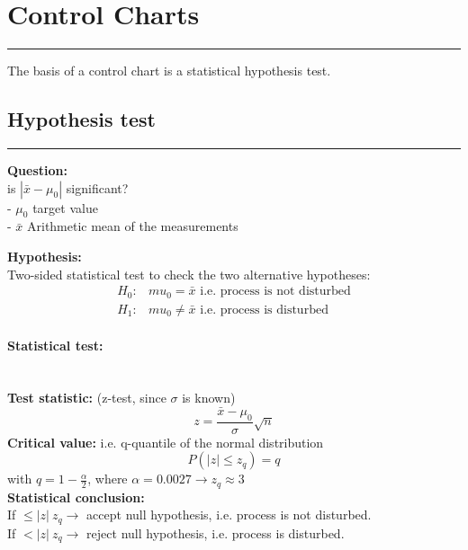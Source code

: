 \section{Control Charts}
\noindent\rule[\linienAbstand]{\linewidth}{\linienDickeDick}
The basis of a control chart is a statistical hypothesis test.

\subsection{Hypothesis test}
\noindent\rule[\linienAbstand]{\linewidth}{\linienDicke}

\textbf{Question:}\\
is $\left|\bar{x} - \mu_0\right|$ significant?\\
 - $\mu_0$ target value\\
 - $\bar{x}$ Arithmetic mean of the measurements


\textbf{Hypothesis:}\\
Two-sided statistical test to check the two alternative hypotheses:
\begin{equation}
  \begin{split}
    H_0:& mu_0 = \bar{x} \text{ i.e. process is not disturbed}\\
    H_1:& mu_0 \neq \bar{x} \text{ i.e. process is disturbed}
  \end{split}
\end{equation}

\paragraph{Statistical test:}\mbox{}\\
\textbf{Test statistic:} (z-test, since $\sigma$ is known)
\begin{equation}
  z = \frac{\bar{x}-\mu_0}{\sigma}\sqrt{n}
\end{equation}
\textbf{Critical value:} i.e. q-quantile of the normal distribution
\begin{equation}
  P(|z| \leq z_q) = q
\end{equation}
with $q = 1- \frac{\alpha}{2}$, where $\alpha = 0.0027 \rightarrow z_q \approx 3$\\

\textbf{Statistical conclusion:}\\
If $\leq |z| \ z_q \rightarrow$ accept null hypothesis, i.e. process is not disturbed.\\
If $< |z| \ z_q \rightarrow$ reject null hypothesis, i.e. process is disturbed.\\


